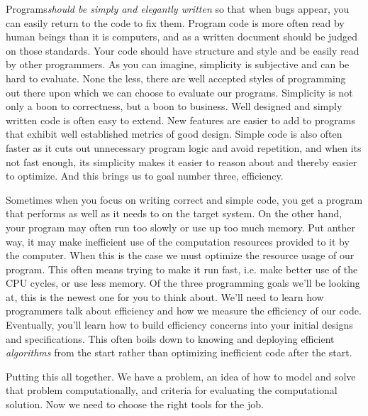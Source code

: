 \documentclass[]{tufte-handout}
\begin{document}
Programs\textit{should be simply and elegantly written} so that when bugs appear, you can easily return to the code to fix them.  Program code is more often read by human beings than it is computers, and as a written document should be judged on those standards.  Your code should have structure and style and be easily read by other programmers.  As you can imagine, simplicity is subjective and can be hard to evaluate.  None the less, there are well accepted styles of programming out there upon which we can choose to evaluate our programs. Simplicity is not only a boon to correctness, but a boon to business. Well designed and simply written code is often easy to extend. New features are easier to add to programs that exhibit well established metrics of good design. Simple code is also often faster as it cuts out unnecessary program logic and avoid repetition, and when its not fast enough, its simplicity makes it easier to reason about and thereby easier to optimize. And this brings us to goal number three, efficiency.

Sometimes when you focus on writing correct and simple code, you get a program that performs as well as it needs to on the target system. On the other hand, your program may often run too slowly or use up too much memory. Put anther way, it may make inefficient use of the computation resources provided to it by the computer.  When this is the case we must optimize the resource usage of our program.  This often means trying to make it run fast, i.e. make better use of the CPU cycles, or use less memory.  Of the three programming goals we'll be looking at, this is the newest one for you to think about.  We'll need to learn how programmers talk about efficiency and how we measure the efficiency of our code. Eventually, you'll learn how to build efficiency concerns into your initial designs and specifications. This often boils down to knowing and deploying efficient \textit{algorithms} from the start rather than optimizing inefficient code after the start.

Putting this all together. We have a problem, an idea of how to model and solve that problem computationally, and criteria for evaluating the computational solution. Now we need to choose the right tools for the job.
  
\end{document}
